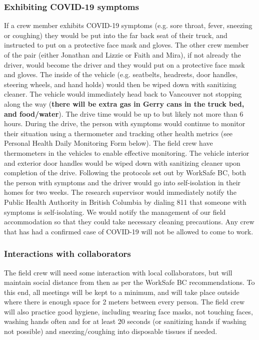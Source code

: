 \documentclass[11pt,letter]{article}
\begin{document}
\subsubsection{Exhibiting COVID-19 symptoms}
If a crew member exhibits COVID-19 symptoms (e.g. sore throat, fever, sneezing or coughing) they would be put into the far back seat of their truck, and instructed to put on a protective face mask and gloves. The other crew member of the pair (either Jonathan and Lizzie or Faith and Mira), if not already the driver, would become the driver and they would put on a protective face mask and gloves. The inside of the vehicle (e.g. seatbelts, headrests, door handles, steering wheels, and hand holds) would then be wiped down with sanitizing cleaner. The vehicle would immediately head back to Vancouver not stopping along the way (\textbf{there will be extra gas in Gerry cans in the truck bed, and food/water}). The drive time would be up to but likely not more than 6 hours. During the drive, the person with symptoms would continue to monitor their situation using a thermometer and tracking other health metrics (see Personal Health Daily Monitoring Form below). The field crew have thermometers in the vehicles to enable effective monitoring. The vehicle interior and exterior door handles would be wiped down with sanitizing cleaner upon completion of the drive. Following the protocols set out by WorkSafe BC, both the person with symptoms and the driver would go into self-isolation in their homes for two weeks. The research supervisor would immediately notify the Public Health Authority in British Columbia by dialing 811 that someone with symptoms is self-isolating. We would notify the management of our field accommodation so that they could take necessary cleaning precautions.  Any crew that has had a confirmed case of COVID-19 will not be allowed to come to work.

\subsubsection{Interactions with collaborators}
The field crew will need some interaction with local collaborators, but will maintain social distance from then as per the WorkSafe BC recommendations. To this end, all meetings will be kept to a minimum, and will take place outside where there is enough space for 2 meters between every person. The field crew will also practice good hygiene, including wearing face masks, not touching faces, washing hands often and for at least 20 seconds (or sanitizing hands if washing not possible) and sneezing/coughing into disposable tissues if needed.  
\end{document}
